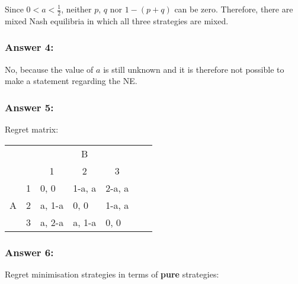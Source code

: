 \documentclass[11pt]{article}
\begin{document}
    Since $0<a<\frac{1}{2}$, neither $p$, $q$ nor $1-(p+q)$ can be zero. Therefore, there are mixed Nash equilibria in which all three strategies are mixed.

    \subsubsection{Answer 4:}
    No, because the value of $a$ is still unknown and it is therefore not possible to make a statement regarding the NE.

    \subsubsection{Answer 5:}
    Regret matrix:

    \begin{table}[h]
        \centering
        \begin{tabular}{lllllll}
            & & \multicolumn{3}{c}{B} & & \\
            &                        & \multicolumn{1}{c}{1}       & \multicolumn{1}{c}{2}       & \multicolumn{1}{c}{3}       & & \\ \cline{3-5}
            \multirow{3}{*}{A} & \multicolumn{1}{r|}{1} & \multicolumn{1}{l|}{0, 0}   & \multicolumn{1}{l|}{1-a, a} & \multicolumn{1}{l|}{2-a, a} &  &  \\ \cline{3-5}
            & \multicolumn{1}{l|}{2} & \multicolumn{1}{l|}{a, 1-a} & \multicolumn{1}{l|}{0, 0}   & \multicolumn{1}{l|}{1-a, a} & & \\ \cline{3-5}
            & \multicolumn{1}{l|}{3} & \multicolumn{1}{l|}{a, 2-a} & \multicolumn{1}{l|}{a, 1-a} & \multicolumn{1}{l|}{0, 0} & & \\ \cline{3-5}
        \end{tabular}
    \end{table}

    \subsubsection{Answer 6:}
    Regret minimisation strategies in terms of \textbf{pure} strategies:
\end{document}
